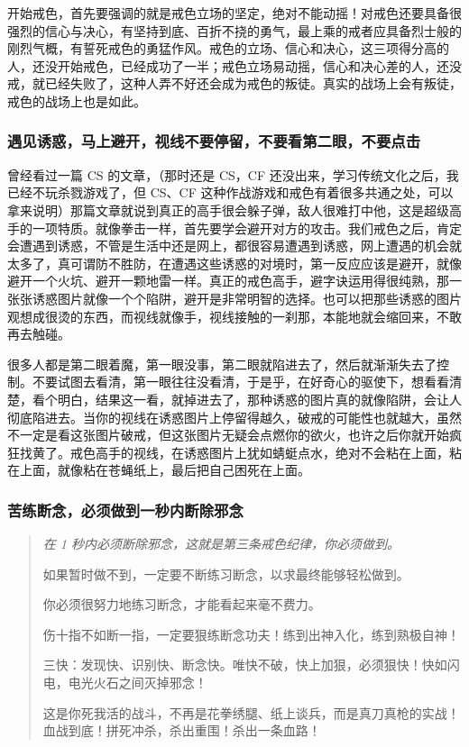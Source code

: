 开始戒色，首先要强调的就是戒色立场的坚定，绝对不能动摇！对戒色还要具备很强烈的信心与决心，有坚持到底、百折不挠的勇气，最上乘的戒者应具备烈士般的刚烈气概，有誓死戒色的勇猛作风。戒色的立场、信心和决心，这三项得分高的人，还没开始戒色，已经成功了一半；戒色立场易动摇，信心和决心差的人，还没戒，就已经失败了，这种人弄不好还会成为戒色的叛徒。真实的战场上会有叛徒，戒色的战场上也是如此。

\subsubsection{遇见诱惑，马上避开，视线不要停留，不要看第二眼，不要点击}

曾经看过一篇 CS 的文章，（那时还是 CS，CF 还没出来，学习传统文化之后，我已经不玩杀戮游戏了，但 CS、CF 这种作战游戏和戒色有着很多共通之处，可以拿来说明）那篇文章就说到真正的高手很会躲子弹，敌人很难打中他，这是超级高手的一项特质。就像拳击一样，首先要学会避开对方的攻击。我们戒色之后，肯定会遭遇到诱惑，不管是生活中还是网上，都很容易遭遇到诱惑，网上遭遇的机会就太多了，真可谓防不胜防，在遭遇这些诱惑的对境时，第一反应应该是避开，就像避开一个火坑、避开一颗地雷一样。真正的戒色高手，避字诀运用得很纯熟，那一张张诱惑图片就像一个个陷阱，避开是非常明智的选择。也可以把那些诱惑的图片观想成很烫的东西，而视线就像手，视线接触的一刹那，本能地就会缩回来，不敢再去触碰。

很多人都是第二眼着魔，第一眼没事，第二眼就陷进去了，然后就渐渐失去了控制。不要试图去看清，第一眼往往没看清，于是乎，在好奇心的驱使下，想看看清楚，看个明白，结果这一看，就掉进去了，那种诱惑的图片真的就像陷阱，会让人彻底陷进去。当你的视线在诱惑图片上停留得越久，破戒的可能性也就越大，虽然不一定是看这张图片破戒，但这张图片无疑会点燃你的欲火，也许之后你就开始疯狂找黄了。戒色高手的视线，在诱惑图片上犹如蜻蜓点水，绝对不会粘在上面，粘在上面，就像粘在苍蝇纸上，最后把自己困死在上面。

\subsubsection{苦练断念，必须做到一秒内断除邪念}

\begin{quotation}\it
    在 1 秒内必须断除邪念，这就是第三条戒色纪律，你必须做到。

    如果暂时做不到，一定要不断练习断念，以求最终能够轻松做到。

    你必须很努力地练习断念，才能看起来毫不费力。

    伤十指不如断一指，一定要狠练断念功夫！练到出神入化，练到熟极自神！

    三快：发现快、识别快、断念快。唯快不破，快上加狠，必须狠快！快如闪电，电光火石之间灭掉邪念！

    这是你死我活的战斗，不再是花拳绣腿、纸上谈兵，而是真刀真枪的实战！血战到底！拼死冲杀，杀出重围！杀出一条血路！
\end{quotation}

